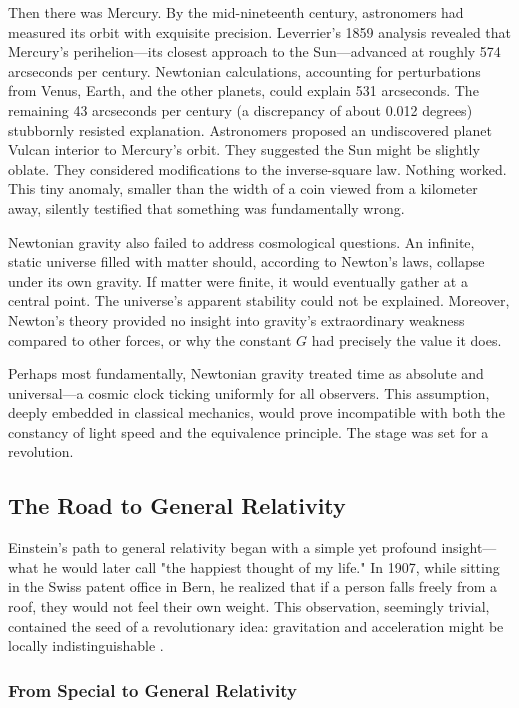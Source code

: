 \documentclass[12pt, a4paper]{article}
\begin{document}
	Then there was Mercury. By the mid-nineteenth century, astronomers had measured its orbit with exquisite precision. Leverrier's 1859 analysis revealed that Mercury's perihelion—its closest approach to the Sun—advanced at roughly 574 arcseconds per century. Newtonian calculations, accounting for perturbations from Venus, Earth, and the other planets, could explain 531 arcseconds. The remaining 43 arcseconds per century (a discrepancy of about 0.012 degrees) stubbornly resisted explanation. Astronomers proposed an undiscovered planet Vulcan interior to Mercury's orbit. They suggested the Sun might be slightly oblate. They considered modifications to the inverse-square law. Nothing worked. This tiny anomaly, smaller than the width of a coin viewed from a kilometer away, silently testified that something was fundamentally wrong.
	
	Newtonian gravity also failed to address cosmological questions. An infinite, static universe filled with matter should, according to Newton's laws, collapse under its own gravity. If matter were finite, it would eventually gather at a central point. The universe's apparent stability could not be explained. Moreover, Newton's theory provided no insight into gravity's extraordinary weakness compared to other forces, or why the constant \(G\) had precisely the value it does.
	
	Perhaps most fundamentally, Newtonian gravity treated time as absolute and universal---a cosmic clock ticking uniformly for all observers. This assumption, deeply embedded in classical mechanics, would prove incompatible with both the constancy of light speed and the equivalence principle. The stage was set for a revolution.
	
	\subsection{The Road to General Relativity}
	
	Einstein's path to general relativity began with a simple yet profound insight---what he would later call "the happiest thought of my life." In 1907, while sitting in the Swiss patent office in Bern, he realized that if a person falls freely from a roof, they would not feel their own weight. This observation, seemingly trivial, contained the seed of a revolutionary idea: gravitation and acceleration might be locally indistinguishable \citep{carrollSpacetimeGeometryIntroduction2019}.
	
	\subsubsection{From Special to General Relativity}
	
\end{document}
